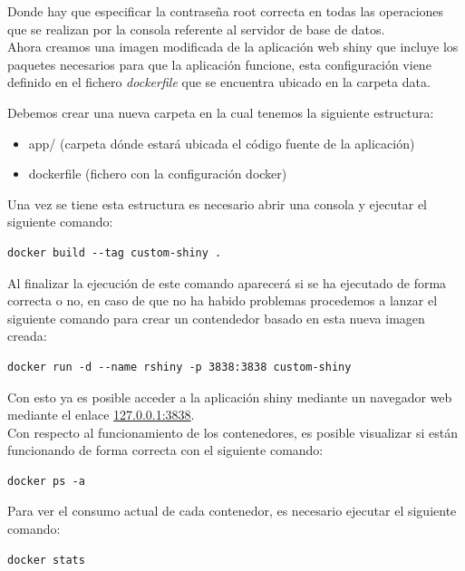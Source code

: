 \documentclass[../../main.tex]{subfiles}
\begin{document}
\vskip 0.2in

Donde hay que especificar la contraseña root correcta en todas las operaciones que se realizan por la consola referente al servidor de base de datos. \\

Ahora creamos una imagen modificada de la aplicación web \Gls{shiny} que incluye los paquetes necesarios para que la aplicación funcione, esta configuración viene definido en el fichero \textit{\Gls{dockerfile}} que se encuentra ubicado en la carpeta data.

Debemos crear una nueva carpeta en la cual tenemos la siguiente estructura:
\begin{itemize}
\item app/ (carpeta dónde estará ubicada el código fuente de la aplicación)
\item \Gls{dockerfile} (fichero con la configuración \Gls{docker})
\end{itemize}

Una vez se tiene esta estructura es necesario abrir una consola y ejecutar el siguiente comando:
\begin{lstlisting}
docker build --tag custom-shiny .
\end{lstlisting}

\vskip 0.2in

Al finalizar la ejecución de este comando aparecerá si se ha ejecutado de forma correcta o no, en caso de que no ha habido problemas procedemos a lanzar el siguiente comando para crear un contendedor basado en esta nueva imagen creada:
\begin{lstlisting}
docker run -d --name rshiny -p 3838:3838 custom-shiny 
\end{lstlisting}

\vskip 0.2in

Con esto ya es posible acceder a la aplicación \Gls{shiny} mediante un navegador web mediante el enlace \href{127.0.0.1:3838}{127.0.0.1:3838}. \\

Con respecto al funcionamiento de los contenedores, es posible visualizar si están funcionando de forma correcta con el siguiente comando:

\begin{lstlisting}
docker ps -a
\end{lstlisting}

\vskip 0.2in

Para ver el consumo actual de cada contenedor, es necesario ejecutar el siguiente comando:

\begin{lstlisting}
docker stats
\end{lstlisting}
\end{document}
